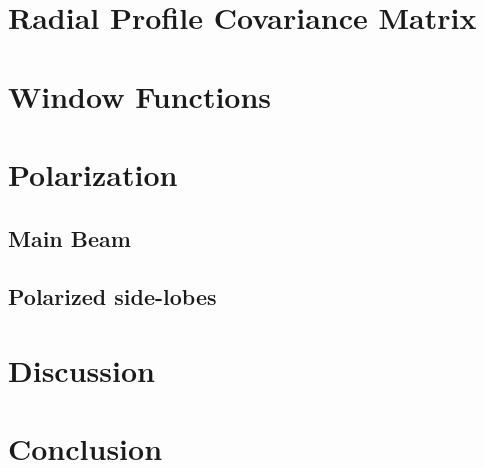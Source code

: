 \section{Radial Profile Covariance Matrix}
\section{Window Functions}

\section{Polarization}
\subsection{Main Beam}
\subsection{Polarized side-lobes}

\section{Discussion}
\section{Conclusion}